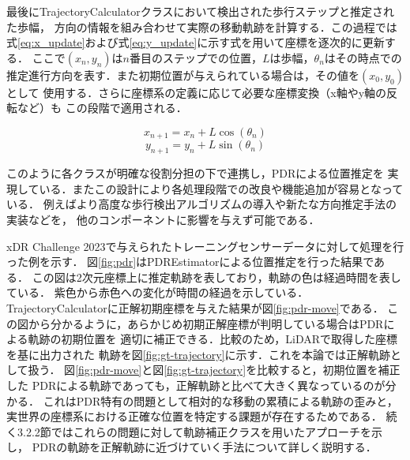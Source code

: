 最後にTrajectoryCalculatorクラスにおいて検出された歩行ステップと推定された歩幅，
方向の情報を組み合わせて実際の移動軌跡を計算する．この過程では式\ref{eq:x_update}および式\ref{eq:y_update}に示す式を用いて座標を逐次的に更新する．
ここで$(x_n, y_n)$は$n$番目のステップでの位置，$L$は歩幅，$\theta_n$はその時点での
推定進行方向を表す．また初期位置が与えられている場合は，その値を$(x_0, y_0)$として
使用する．さらに座標系の定義に応じて必要な座標変換（x軸やy軸の反転など）も
この段階で適用される．



\begin{equation}
\label{eq:x_update}
x_{n+1} = x_n + L \cos(\theta_n)
\end{equation}
\begin{equation}
\label{eq:y_update}
y_{n+1} = y_n + L \sin(\theta_n)
\end{equation}


このように各クラスが明確な役割分担の下で連携し，PDRによる位置推定を
実現している．またこの設計により各処理段階での改良や機能追加が容易となっている．
例えばより高度な歩行検出アルゴリズムの導入や新たな方向推定手法の実装などを，
他のコンポーネントに影響を与えず可能である．


xDR Challenge 2023で与えられたトレーニングセンサーデータに対して処理を行った例を示す．
図\ref{fig:pdr}はPDREstimatorによる位置推定を行った結果である．
この図は2次元座標上に推定軌跡を表しており，軌跡の色は経過時間を表している．
紫色から赤色への変化が時間の経過を示している．
TrajectoryCalculatorに正解初期座標を与えた結果が図\ref{fig:pdr-move}である．
この図から分かるように，あらかじめ初期正解座標が判明している場合はPDRによる軌跡の初期位置を
適切に補正できる．比較のため，LiDARで取得した座標を基に出力された
軌跡を図\ref{fig:gt-trajectory}に示す．これを本論では正解軌跡として扱う．
図\ref{fig:pdr-move}と図\ref*{fig:gt-trajectory}を比較すると，初期位置を補正した
PDRによる軌跡であっても，正解軌跡と比べて大きく異なっているのが分かる．
これはPDR特有の問題として相対的な移動の累積による軌跡の歪みと，
実世界の座標系における正確な位置を特定する課題が存在するためである．
続く3.2.2節ではこれらの問題に対して軌跡補正クラスを用いたアプローチを示し，
PDRの軌跡を正解軌跡に近づけていく手法について詳しく説明する．




